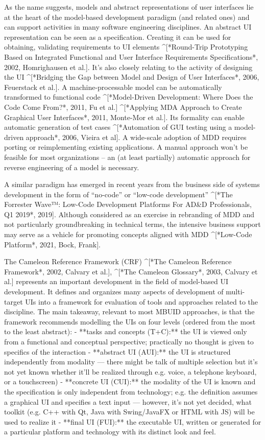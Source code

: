 As the name suggests, models and abstract representations of user interfaces lie at the heart of the model-based development paradigm (and related ones) and can support activities in many software engineering disciplines.
An abstract UI representation can be seen as a specification.
Creating it can be used for obtaining, validating requirements to UI elements ^[*Round-Trip Prototyping Based on Integrated Functional and User Interface Requirements Specifications*, 2002, Homrighausen et al.].
It’s also closely relating to the activity of designing the UI ^[*Bridging the Gap between Model and Design of User Interfaces*, 2006, Feuerstack et al.].
A machine-processable model can be automatically transformed to functional code ^[*Model-Driven Development: Where Does the Code Come From?*, 2011, Fu et al.] ^[*Applying MDA Approach to Create Graphical User Interfaces*, 2011, Monte-Mor et al.].
Its formality can enable automatic generation of test cases ^[*Automation of GUI testing using a model-driven approach*, 2006, Vieira et al].
A wide-scale adoption of MDD requires porting or reimplementing existing applications.
A manual approach won’t be feasible for most organizations – an (at least partially) automatic approach for reverse engineering of a model is necessary.

A similar paradigm has emerged in recent years from the business side of systems development in the form of “no-code” or “low-code development” ^[*The Forrester Wave™: Low-Code Development Platforms For AD\&D Professionals, Q1 2019*, 2019].
Although considered as an exercise in rebranding of MDD and not particularly groundbreaking in technical terms, the intensive business support may serve as a vehicle for promoting concepts aligned with MDD ^[*Low-Code Platform*, 2021, Bock, Frank].

The Cameleon Reference Framework (CRF) ^[*The Cameleon Reference Framework*, 2002, Calvary et al.], ^[*The Cameleon Glossary*, 2003, Calvary et al.] represents an important development in the field of model-based UI development.
It defines and organizes many aspects of development of multi-target UIs into a framework for evaluation of tools and approaches related to the discipline.
The main takeaway, relevant to most MBUID approaches, is that the framework recommends modelling the UIs on four levels (ordered from the most to the least abstract):
- **tasks and concepts (T+C):** the UI is viewed only from a functional and conceptual perspective; practically no thought is given to specifics of the interaction
- **abstract UI (AUI):** the UI is structured independently from modality — there might be talk of multiple selection but it’s not yet known whether it’ll be realized through e.g. voice, a telephone keyboard, or a touchscreen)
- **concrete UI (CUI):** the modality of the UI is known and the specification is only independent from technology; e.g. the definition assumes a graphical UI and specifies a text input — however, it’s not yet decided, what toolkit (e.g. C++ with Qt, Java with Swing/JavaFX or HTML with JS) will be used to realize it
- **final UI (FUI):** the executable UI, written or generated for a particular platform and technology with its distinct look and feel.

